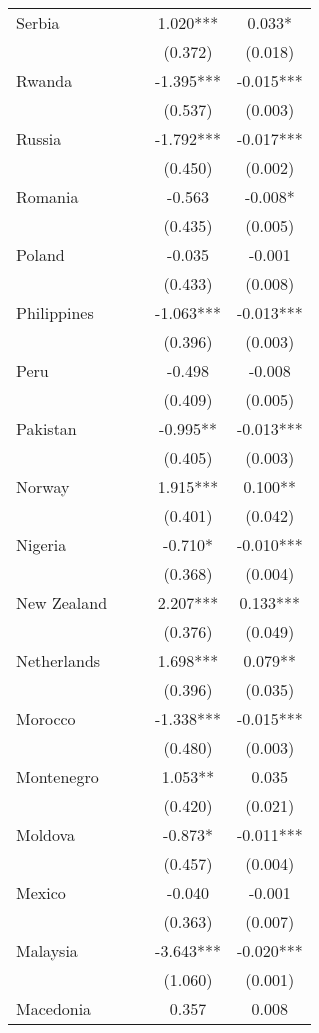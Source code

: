 \documentclass[]{article}
\begin{document}
\begin{tabular}{lcccc}
Serbia &  &  & 1.020*** & 0.033* \\
 &  &  & (0.372) & (0.018) \\
Rwanda &  &  & -1.395*** & -0.015*** \\
 &  &  & (0.537) & (0.003) \\
Russia &  &  & -1.792*** & -0.017*** \\
 &  &  & (0.450) & (0.002) \\
Romania &  &  & -0.563 & -0.008* \\
 &  &  & (0.435) & (0.005) \\
Poland &  &  & -0.035 & -0.001 \\
 &  &  & (0.433) & (0.008) \\
Philippines &  &  & -1.063*** & -0.013*** \\
 &  &  & (0.396) & (0.003) \\
Peru &  &  & -0.498 & -0.008 \\
 &  &  & (0.409) & (0.005) \\
Pakistan &  &  & -0.995** & -0.013*** \\
 &  &  & (0.405) & (0.003) \\
Norway &  &  & 1.915*** & 0.100** \\
 &  &  & (0.401) & (0.042) \\
Nigeria &  &  & -0.710* & -0.010*** \\
 &  &  & (0.368) & (0.004) \\
New Zealand &  &  & 2.207*** & 0.133*** \\
 &  &  & (0.376) & (0.049) \\
Netherlands &  &  & 1.698*** & 0.079** \\
 &  &  & (0.396) & (0.035) \\
Morocco &  &  & -1.338*** & -0.015*** \\
 &  &  & (0.480) & (0.003) \\
Montenegro &  &  & 1.053** & 0.035 \\
 &  &  & (0.420) & (0.021) \\
Moldova &  &  & -0.873* & -0.011*** \\
 &  &  & (0.457) & (0.004) \\
Mexico &  &  & -0.040 & -0.001 \\
 &  &  & (0.363) & (0.007) \\
Malaysia &  &  & -3.643*** & -0.020*** \\
 &  &  & (1.060) & (0.001) \\
Macedonia &  &  & 0.357 & 0.008 \\

\end{tabular}
\end{document}
